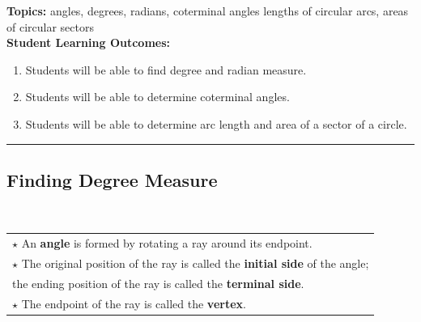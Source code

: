 
\noindent \textbf{Topics:}  angles, degrees, radians, coterminal angles lengths of circular arcs, areas of circular sectors\\

\noindent \textbf{Student Learning Outcomes:}
\begin{enumerate}
\item Students will be able to find degree and radian measure.
\item Students will be able to determine coterminal angles.
\item Students will be able to determine arc length and area of a sector of a circle.
\end{enumerate}

\hrule 

\bigskip

\subsection{Finding Degree Measure} ~

\begin{tabular}{| l |}\hline 
$\star$ An \textbf{angle} is formed by rotating a ray around its endpoint.\\
$\star$  The original position of the ray is called the \textbf{initial side} of the angle;\\ the ending position of the ray is called the \textbf{terminal side}.\\
$\star$  The endpoint of the ray is called the \textbf{vertex}.\\
\hline
\end{tabular}
  
\noindent{} 






